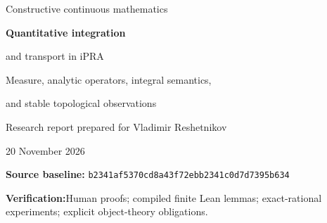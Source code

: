 \documentclass[11pt,letterpaper]{article}
\newcommand{\ipra}{\ensuremath{\mathrm{iPRA}}}
\newcommand{\Prf}{\operatorname{Prf}}
\theoremstyle{definition}
\begin{document}
\hypersetup{pageanchor=false}
\begin{titlepage}
\vspace*{1.0cm}
{\color{inkblue}\Large Constructive continuous mathematics\par}
\vspace{1.1cm}
{\huge\bfseries Quantitative integration\par and transport in \ipra\par}
\vspace{0.7cm}
{\Large Measure, analytic operators, integral semantics,\par
and stable topological observations\par}
\vspace{1.2cm}
{\large Research report prepared for Vladimir Reshetnikov\par}
\vspace{0.35cm}
20 November 2026
\vspace{1.2cm}
\begin{abstract}
We develop a finite arithmetic interface for continuous and abstract
mathematics in intuitionistic primitive recursive arithmetic. The main
constructions use rational dyadic data, regular names, explicitly bounded
operators, and verified error propagation. A stable clipping inequality
repairs a source-level Vitali argument and constructs an integrable limit
from a bounded-metric Cauchy rate and uniform tail data. Coherent dyadic
masses yield a density from energy certificates, and a local sibling bound
produces those certificates. An energy cap alone yields a finite
metastability theorem, with an explicit obstruction to extracting a
uniform convergence rate. Bounded operators, integral-quantifier semantics,
Rips interleavings, contractive integral equations, and holomorphic
transforms are developed with their exact hypotheses. Counterexamples
identify invalid diagonal substitution and unsuitable operator norms.
The package contains complete human proofs, a standalone compiled Lean
kernel of finite rational lemmas, and detailed definitions and proof plans
for the remaining object-\ipra\ derivations. The new analytic endpoints
are not claimed to be fully reified as \(\Prf\,\mathrm{PRAAx}\) proofs.
\end{abstract}
\vfill
\noindent\textbf{Source baseline:}\quad
\texttt{b2341af5370cd8a43f72ebb2341c0d7d7395b634}\par
\smallskip
\noindent\textbf{Verification:}\quad Human proofs; compiled finite Lean
lemmas; exact-rational experiments; explicit object-theory obligations.
\end{titlepage}
\hypersetup{pageanchor=true}
\tableofcontents
\clearpage








\clearpage

\end{document}
